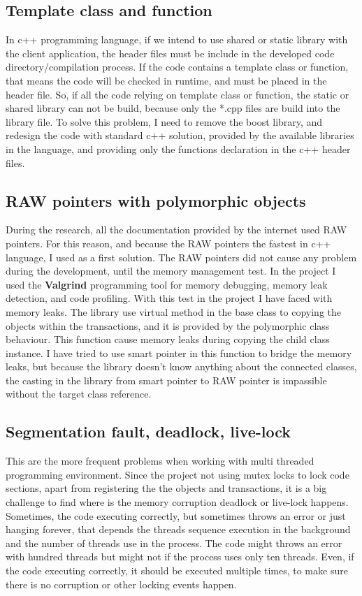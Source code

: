 \documentclass[12pt]{article}
\begin{document}
\subsection{Template class and function}
In c++ programming language, if we intend to use shared or static library with the client application, the header files must be include in the developed code directory/compilation process. If the code contains a template class or function, that means the code will be checked in runtime, and must be placed in the header file. So, if all the code relying on template class or function, the static or shared library can not be build, because only the *.cpp files are build into the library file. To solve this problem, I need to remove the boost library, and redesign the code with standard c++ solution, provided by the available libraries in the  language, and providing only the functions declaration in the c++ header files.

\subsection{RAW pointers with polymorphic objects}
During the research, all the documentation provided by the internet used RAW pointers. For this reason, and because the RAW pointers the fastest in c++ language, I used as a first solution. The RAW pointers did not cause any problem during the development, until the memory management test. In the project I used the \textbf{Valgrind} programming tool for memory debugging, memory leak detection, and code profiling. With this test in the project I have faced with memory leaks. The library use virtual method in the base class to copying the objects within the transactions, and it is provided by the polymorphic class behaviour. This function cause memory leaks during copying the child class instance. I have tried to use smart pointer in this function to bridge the memory leaks, but because the library doesn't know anything about the connected classes, the casting in the library from smart pointer to RAW pointer is impassible without the target class reference.

\subsection{Segmentation fault, deadlock, live-lock}
This are the more frequent problems when working with multi threaded programming environment. Since the project not using mutex locks to lock code sections, apart from registering the the objects and transactions, it is a big challenge to find where is the memory corruption deadlock or live-lock happens. Sometimes, the code executing correctly, but sometimes throws an error or just hanging forever, that depends the threads sequence execution in the background and the number of threads use in the process. The code might throws an error with hundred threads but might not if the process uses only ten threads. Even, if the code executing correctly, it should be executed multiple times, to make sure there is no corruption or other locking events happen.\\
\end{document}
